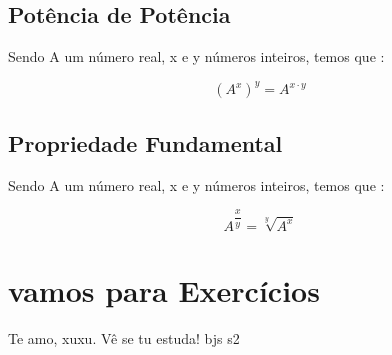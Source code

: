 \documentclass[a4paper, 12pt]{article}
\begin{document}
\subsection{Potência de Potência}
Sendo A um número real, x e y números inteiros, temos que :

$$ (A^x)^y = A^{x \cdot y}$$
\subsection{Propriedade Fundamental}
Sendo A um número real, x e y números inteiros, temos que :

$$A^{\dfrac{x}{y}} = \sqrt[y]{A^x}$$

\section{vamos para Exercícios}
\begin{center}
Te amo, xuxu. Vê se tu estuda! bjs s2
\end{center}
\end{document}
